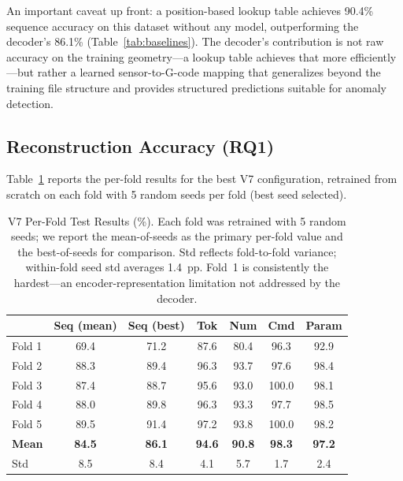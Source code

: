 \documentclass[sensors,article,submit,moreauthors,pdftex]{Definitions/mdpi}
\begin{document}
An important caveat up front: a position-based lookup table achieves 90.4\% sequence accuracy on this dataset without any model, outperforming the decoder's 86.1\% (Table~\ref{tab:baselines}). The decoder's contribution is not raw accuracy on the training geometry---a lookup table achieves that more efficiently---but rather a learned sensor-to-G-code mapping that generalizes beyond the training file structure and provides structured predictions suitable for anomaly detection.

\subsection{Reconstruction Accuracy (RQ1)}
\label{sec:rq1_accuracy}

Table~\ref{tab:v7_5fold} reports the per-fold results for the best V7 configuration, retrained from scratch on each fold with 5 random seeds per fold (best seed selected).

\begin{table}[htbp]
\centering
\caption{V7 Per-Fold Test Results (\%). Each fold was retrained with 5 random seeds; we report the mean-of-seeds as the primary per-fold value and the best-of-seeds for comparison. Std reflects fold-to-fold variance; within-fold seed std averages 1.4~pp. Fold~1 is consistently the hardest---an encoder-representation limitation not addressed by the decoder.}
\label{tab:v7_5fold}
\small
\begin{tabular}{@{}lcccccc@{}}
\toprule
& \textbf{Seq (mean)} & \textbf{Seq (best)} & \textbf{Tok} & \textbf{Num} & \textbf{Cmd} & \textbf{Param} \\
\midrule
Fold 1 & 69.4 & 71.2 & 87.6 & 80.4 & 96.3 & 92.9 \\
Fold 2 & 88.3 & 89.4 & 96.3 & 93.7 & 97.6 & 98.4 \\
Fold 3 & 87.4 & 88.7 & 95.6 & 93.0 & 100.0 & 98.1 \\
Fold 4 & 88.0 & 89.8 & 96.3 & 93.3 & 97.7 & 98.5 \\
Fold 5 & 89.5 & 91.4 & 97.2 & 93.8 & 100.0 & 98.2 \\
\midrule
\textbf{Mean} & \textbf{84.5} & \textbf{86.1} & \textbf{94.6} & \textbf{90.8} & \textbf{98.3} & \textbf{97.2} \\
Std          & 8.5           & 8.4           & 4.1          & 5.7          & 1.7          & 2.4 \\
\bottomrule
\end{tabular}
\normalsize
\end{table}
\end{document}
